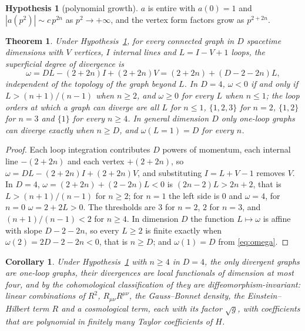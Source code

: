 \documentclass[aps,prd,10pt,twocolumn,superscriptaddress,nofootinbib,floatfix,longbibliography,showpacs,showkeys]{revtex4-2}
\theoremstyle{plain}
\newtheorem{theorem}{Theorem}
\newtheorem{corollary}{Corollary}
\theoremstyle{definition}
\newtheorem{hypothesis}{Hypothesis}
\theoremstyle{remark}
\begin{document}
\begin{hypothesis}[polynomial growth]
\label{hyp:growth}
$a$ is entire with $a(0)=1$ and $|a(p^2)|\sim c\,p^{2n}$ as $p^2\to+\infty$, and the vertex form factors grow as $p^{2+2n}$.
\end{hypothesis}

\begin{theorem}
\label{thm:power}
Under Hypothesis~\ref{hyp:growth}, for every connected graph in $D$ spacetime dimensions with $V$ vertices, $I$ internal lines and $L=I-V+1$ loops, the superficial degree of divergence is
\begin{equation}
\label{eq:omega}
\omega=DL-(2+2n)I+(2+2n)V=(2+2n)+(D-2-2n)L,
\end{equation}
independent of the topology of the graph beyond $L$. In $D=4$, $\omega<0$ if and only if $L>(n+1)/(n-1)$ when $n\ge2$, and $\omega\ge0$ for every $L$ when $n\le1$; the loop orders at which a graph can diverge are all $L$ for $n\le1$, $\{1,2,3\}$ for $n=2$, $\{1,2\}$ for $n=3$ and $\{1\}$ for every $n\ge4$. In general dimension $D$ only one-loop graphs can diverge exactly when $n\ge D$, and $\omega(L=1)=D$ for every $n$.
\end{theorem}

\begin{proof}
Each loop integration contributes $D$ powers of momentum, each internal line $-(2+2n)$ and each vertex $+(2+2n)$, so $\omega=DL-(2+2n)I+(2+2n)V$, and substituting $I=L+V-1$ removes $V$. In $D=4$, $\omega=(2+2n)+(2-2n)L<0$ is $(2n-2)L>2n+2$, that is $L>(n+1)/(n-1)$ for $n\ge2$; for $n=1$ the left side is $0$ and $\omega=4$, for $n=0$ $\omega=2+2L>0$. The thresholds are $3$ for $n=2$, $2$ for $n=3$, and $(n+1)/(n-1)<2$ for $n\ge4$. In dimension $D$ the function $L\mapsto\omega$ is affine with slope $D-2-2n$, so every $L\ge2$ is finite exactly when $\omega(2)=2D-2-2n<0$, that is $n\ge D$; and $\omega(1)=D$ from \eqref{eq:omega}.
\end{proof}

\begin{corollary}
\label{cor:counterterms}
Under Hypothesis~\ref{hyp:growth} with $n\ge4$ in $D=4$, the only divergent graphs are one-loop graphs, their divergences are local functionals of dimension at most four, and by the cohomological classification of \cite{BarnichBrandtHenneaux2000} they are diffeomorphism-invariant: linear combinations of $R^2$, $R_{\mu\nu}R^{\mu\nu}$, the Gauss--Bonnet density, the Einstein--Hilbert term $R$ and a cosmological term, each with its factor $\sqrt g$, with coefficients that are polynomial in finitely many Taylor coefficients of $H$.
\end{corollary}
\end{document}
